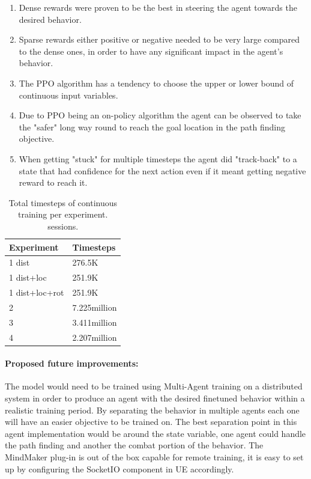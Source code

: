 \documentclass[a4paper,one side,12pt]{book}
\begin{document}
\begin{enumerate}
\def\labelenumi{\arabic{enumi}.}
\item
  Dense rewards were proven to be the best in steering the agent towards
  the desired behavior.
\item 
  Sparse rewards either positive or negative needed to be very large compared to the dense ones, in order to have any 
  significant impact in the agent's behavior.
\item
  The PPO algorithm has a tendency to choose the upper or lower bound of continuous input variables.
\item
  Due to PPO being an on-policy algorithm the agent can be observed to
  take the "safer" long way round to reach the goal location in the
  path finding objective.
\item
  When getting "stuck" for multiple timesteps the agent did "track-back" to a state that had confidence for the next action 
  even if it meant getting negative reward to reach it.
\end{enumerate}


\begin{table}[H]
    \centering  
    \begin{tabular}
    {|m{7em}||m{7em}|}
    \hline
         Experiment&Timesteps\\
    \hline    
    \hline       					
    1 dist	&276.5K\\
    \hline   
    1 dist+loc	&251.9K\\
    \hline 
    1 dist+loc+rot	&251.9K	\\
    \hline 
    2	&7.225million\\
    \hline   
    3	&3.411million\\
    \hline   
    4	&2.207million\\

         \hline
    \end{tabular}
    \caption{Total timesteps of continuous training per experiment.
sessions.}
\end{table} 
 

\paragraph{Proposed future improvements:\\}

The model would need to be trained using Multi-Agent training on a
distributed system in order to produce an agent with the desired
finetuned behavior within a realistic training period. By separating the behavior in multiple agents each one will have an easier objective to be trained on. 
The best separation point in this agent implementation would be around the state variable, one agent could handle the path finding and another the combat portion of the behavior. 
The MindMaker plug-in is out of the box capable for remote training, it is easy to set up by configuring the SocketIO component in UE accordingly.
\end{document}

